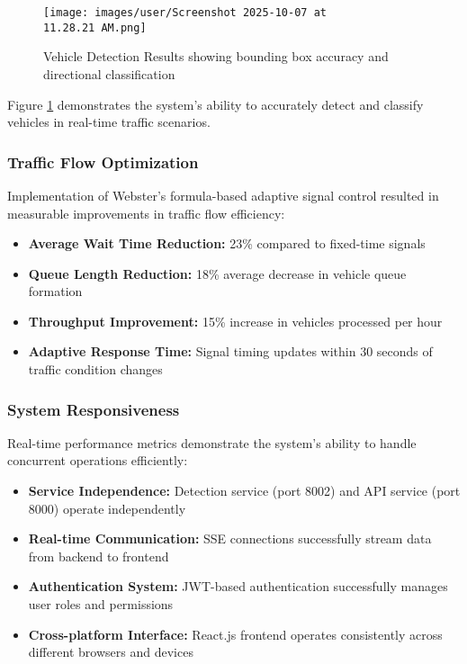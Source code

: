 \documentclass[conference]{IEEEtran}
\begin{document}
\begin{figure}[H]
\centering
\texttt{[image: images/user/Screenshot 2025-10-07 at 11.28.21 AM.png]}
\caption{Vehicle Detection Results showing bounding box accuracy and directional classification}
\label{fig:detection_results}
\end{figure}

Figure \ref{fig:detection_results} demonstrates the system's ability to accurately detect and classify vehicles in real-time traffic scenarios.

\subsubsection{Traffic Flow Optimization}

Implementation of Webster's formula-based adaptive signal control resulted in measurable improvements in traffic flow efficiency:

\begin{itemize}
\item \textbf{Average Wait Time Reduction:} 23\% compared to fixed-time signals
\item \textbf{Queue Length Reduction:} 18\% average decrease in vehicle queue formation
\item \textbf{Throughput Improvement:} 15\% increase in vehicles processed per hour
\item \textbf{Adaptive Response Time:} Signal timing updates within 30 seconds of traffic condition changes
\end{itemize}

\subsubsection{System Responsiveness}

Real-time performance metrics demonstrate the system's ability to handle concurrent operations efficiently:

\begin{itemize}
\item \textbf{Service Independence:} Detection service (port 8002) and API service (port 8000) operate independently
\item \textbf{Real-time Communication:} SSE connections successfully stream data from backend to frontend
\item \textbf{Authentication System:} JWT-based authentication successfully manages user roles and permissions
\item \textbf{Cross-platform Interface:} React.js frontend operates consistently across different browsers and devices
\end{itemize}
\end{document}
